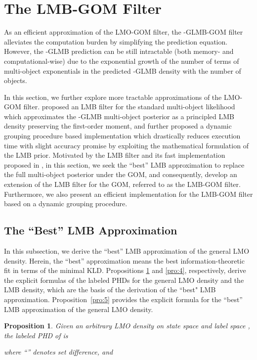 \documentclass[journal]{IEEEtran}
\newtheorem{Pro}{Proposition}
\begin{document}
{\section{The LMB-GOM Filter}\label{chp:5}
As an efficient approximation of the LMO-GOM filter,  the -GLMB-GOM filter  alleviates the computation burden by simplifying the prediction equation. However, the -GLMB prediction can be still intractable (both memory- and computational-wise) due to the exponential growth of the number of  terms of multi-object exponentials in the predicted -GLMB density  with the number of objects.

 In this section, we further explore  more tractable approximations of the LMO-GOM filter.  \cite{refr:label_5} proposed an LMB  filter for the standard multi-object likelihood which approximates the -GLMB multi-object posterior as a principled LMB density preserving the first-order moment, and further proposed a dynamic grouping procedure based implementation  which drastically reduces execution time with slight accuracy promise by exploiting the mathematical formulation of the LMB prior.
Motivated by the LMB filter  and its fast implementation proposed in \cite{refr:label_5}, in this section, we seek the ``best'' LMB   approximation to   replace the full  multi-object posterior under the GOM, and consequently,  develop an extension of the LMB filter for  the GOM,  referred to as the LMB-GOM filter.  Furthermore, we also present an efficient implementation   for the  LMB-GOM filter based on a dynamic grouping procedure. 
 
 


\subsection{The ``Best'' LMB Approximation}
In this subsection,  we  derive  the ``best'' LMB approximation of the general LMO density.   Herein, the ``best'' approximation means the  best information-theoretic fit in terms of the minimal KLD. Propositions \ref{pro:3} and \ref{pro:4}, respectively, derive the explicit formulas of the labeled PHDs for the general LMO density and the LMB density, which are the basis of  the derivation of the ``best" LMB approximation.  Proposition~\ref{pro:5}  provides the explicit formula for the  ``best'' LMB  approximation of the general LMO density.
\begin{Pro}\label{pro:3}
Given an arbitrary LMO density  on state space  and label space , the labeled PHD of  is
 
where ``'' denotes set difference, and 
 

\end{Pro}}
\end{document}
